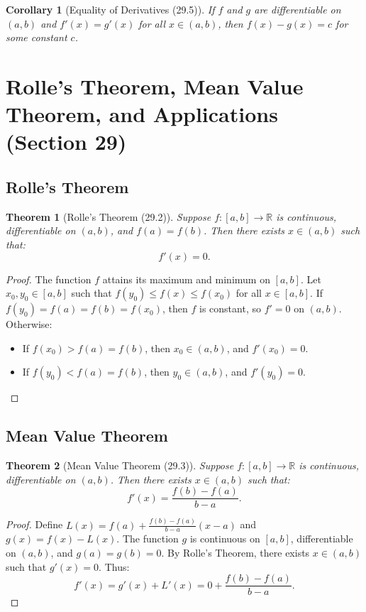 \documentclass[9pt]{article}
\theoremstyle{definition}
\theoremstyle{plain}
\newtheorem{theorem}{Theorem}
\newtheorem{corollary}{Corollary}
\begin{document}
\begin{corollary}[Equality of Derivatives (29.5)]
If \( f \) and \( g \) are differentiable on \( (a, b) \) and \( f'(x) = g'(x) \) for all \( x \in (a, b) \), then \( f(x) - g(x) = c \) for some constant \( c \).
\end{corollary}
\section*{Rolle’s Theorem, Mean Value Theorem, and Applications (Section 29)}

\subsection*{Rolle’s Theorem}
\begin{theorem}[Rolle’s Theorem (29.2)]
Suppose \( f : [a, b] \to \mathbb{R} \) is continuous, differentiable on \( (a, b) \), and \( f(a) = f(b) \). Then there exists \( x \in (a, b) \) such that:
\[
f'(x) = 0.
\]
\end{theorem}

\begin{proof}
The function \( f \) attains its maximum and minimum on \( [a, b] \). Let \( x_0, y_0 \in [a, b] \) such that \( f(y_0) \leq f(x) \leq f(x_0) \) for all \( x \in [a, b] \). If \( f(y_0) = f(a) = f(b) = f(x_0) \), then \( f \) is constant, so \( f' = 0 \) on \( (a, b) \). Otherwise:
\begin{itemize}
    \item If \( f(x_0) > f(a) = f(b) \), then \( x_0 \in (a, b) \), and \( f'(x_0) = 0 \).
    \item If \( f(y_0) < f(a) = f(b) \), then \( y_0 \in (a, b) \), and \( f'(y_0) = 0 \).
\end{itemize}
\end{proof}

\subsection*{Mean Value Theorem}
\begin{theorem}[Mean Value Theorem (29.3)]
Suppose \( f : [a, b] \to \mathbb{R} \) is continuous, differentiable on \( (a, b) \). Then there exists \( x \in (a, b) \) such that:
\[
f'(x) = \frac{f(b) - f(a)}{b - a}.
\]
\end{theorem}

\begin{proof}
Define \( L(x) = f(a) + \frac{f(b) - f(a)}{b - a}(x - a) \) and \( g(x) = f(x) - L(x) \). The function \( g \) is continuous on \( [a, b] \), differentiable on \( (a, b) \), and \( g(a) = g(b) = 0 \). By Rolle’s Theorem, there exists \( x \in (a, b) \) such that \( g'(x) = 0 \). Thus:
\[
f'(x) = g'(x) + L'(x) = 0 + \frac{f(b) - f(a)}{b - a}.
\]
\end{proof}
\end{document}
